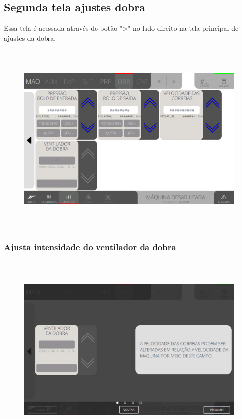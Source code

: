 \newpage
\thispagestyle{fancy}
\vspace*{40 pt}
\subsection{Segunda tela ajustes dobra}
Essa tela é acessada através do botão "\textgreater" no lado direito na tela principal de ajustes da dobra.
\vspace*{\fill}
\begin{figure}[h]
  \centering
  \includegraphics[width=576px,height=360px]{src/imagesFlexo/07-fold/settings/e-Tela-Principal-2.png}
\end{figure}
\vspace*{\fill}


\newpage
\thispagestyle{fancy}
\vspace*{40 pt}
\subsubsection{\small{Ajusta intensidade do ventilador da dobra}}
\vspace*{\fill}
\begin{figure}[h]
  \centering
  \includegraphics[width=576px,height=360px]{src/imagesFlexo/07-fold/settings/e-6.png}
\end{figure}
\vspace*{\fill}


